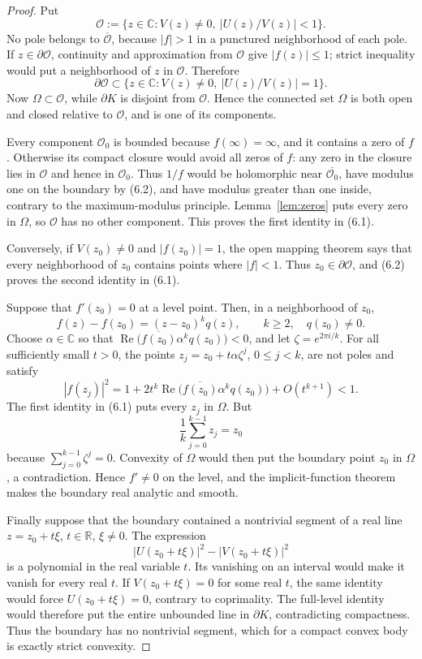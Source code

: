 \documentclass[preprints,article,submit,oneauthor]{Definitions/mdpi}
\numberwithin{equation}{section}
\newcommand{\C}{\mathbb C}
\newcommand{\R}{\mathbb R}
\newcommand{\Rea}{\operatorname{Re}}
\begin{document}
\begin{proof}
Put
\[
 \mathcal O:=\{z\in\C:V(z)\neq0,\ |U(z)/V(z)|<1\}.
\]
No pole belongs to \(\overline{\mathcal O}\), because \(|f|>1\) in a
punctured neighborhood of each pole.  If \(z\in\partial\mathcal O\), continuity
and approximation from \(\mathcal O\) give \(|f(z)|\leq1\); strict inequality
would put a neighborhood of \(z\) in \(\mathcal O\).  Therefore
\[
 \partial\mathcal O\subset
 \{z\in\C:V(z)\neq0,\ |U(z)/V(z)|=1\}.              \tag{6.2}
\]
Now \(\Omega\subset\mathcal O\), while \(\partial K\) is disjoint from
\(\mathcal O\).  Hence the connected set \(\Omega\) is both open and closed
relative to \(\mathcal O\), and is one of its components.

Every component \(\mathcal O_0\) is bounded because \(f(\infty)=\infty\), and
it contains a zero of \(f\).  Otherwise its compact closure would avoid all
zeros of \(f\): any zero in the closure lies in \(\mathcal O\) and hence in
\(\mathcal O_0\).  Thus \(1/f\) would be holomorphic near
\(\overline{\mathcal O_0}\), have modulus one on the boundary by (6.2), and
have modulus greater than one inside, contrary to the maximum-modulus
principle.  Lemma~\ref{lem:zeros} puts every zero in \(\Omega\), so
\(\mathcal O\) has no other component.  This proves the first identity in
(6.1).

Conversely, if \(V(z_0)\neq0\) and
\(|f(z_0)|=1\), the open mapping theorem says that every neighborhood of
\(z_0\) contains points where \(|f|<1\).  Thus
\(z_0\in\partial\mathcal O\), and (6.2) proves the second identity in (6.1).

Suppose that \(f'(z_0)=0\) at a level point.  Then, in a neighborhood of
\(z_0\),
\[
 f(z)-f(z_0)=(z-z_0)^kq(z),\qquad k\geq2,\quad q(z_0)\neq0.
\]
Choose \(\alpha\in\C\) so that
\(\Rea\bigl(\overline{f(z_0)}\alpha^kq(z_0)\bigr)<0\), and let
\(\zeta=e^{2\pi i/k}\).  For all sufficiently small \(t>0\), the points
\(z_j=z_0+t\alpha\zeta^j\), \(0\leq j<k\), are not poles and satisfy
\[
 |f(z_j)|^2
 =1+2t^k\Rea\bigl(\overline{f(z_0)}\alpha^kq(z_0)\bigr)
   +O(t^{k+1})<1.
\]
The first identity in (6.1) puts every \(z_j\) in \(\Omega\).  But
\[
 \frac1k\sum_{j=0}^{k-1}z_j=z_0
\]
because \(\sum_{j=0}^{k-1}\zeta^j=0\).  Convexity of \(\Omega\) would then put
the boundary point \(z_0\) in \(\Omega\), a contradiction.  Hence
\(f'\neq0\) on the level, and the implicit-function theorem makes the boundary
real analytic and smooth.

Finally suppose that the boundary contained a nontrivial segment of a real
line \(z=z_0+t\xi\), \(t\in\R\), \(\xi\neq0\).  The expression
\[
 |U(z_0+t\xi)|^2-|V(z_0+t\xi)|^2
\]
is a polynomial in the real variable \(t\).  Its vanishing on an interval
would make it vanish for every real \(t\).  If \(V(z_0+t\xi)=0\) for some real
\(t\), the same identity would force \(U(z_0+t\xi)=0\), contrary to
coprimality.  The full-level identity would therefore put the entire
unbounded line in \(\partial K\), contradicting compactness.  Thus the boundary
has no nontrivial segment, which for a compact convex body is exactly strict
convexity.
\end{proof}
\end{document}

